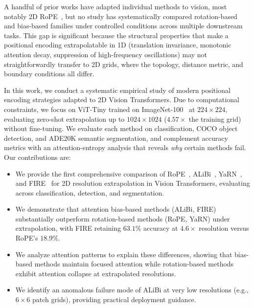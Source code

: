 A handful of prior works have adapted individual methods to vision, most notably 2D RoPE~\cite{heo2024rope}, but no study has systematically compared rotation-based and bias-based families under controlled conditions across multiple downstream tasks. This gap is significant because the structural properties that make a positional encoding extrapolatable in 1D (translation invariance, monotonic attention decay, suppression of high-frequency oscillations) may not straightforwardly transfer to 2D grids, where the topology, distance metric, and boundary conditions all differ.

In this work, we conduct a systematic empirical study of modern positional encoding strategies adapted to 2D Vision Transformers. Due to computational constraints, we focus on ViT-Tiny trained on ImageNet-100~\cite{deng2009imagenet} at $224 \times 224$, evaluating zero-shot extrapolation up to $1024 \times 1024$ ($4.57\times$ the training grid) without fine-tuning. We evaluate each method on classification, COCO object detection, and ADE20K semantic segmentation, and complement accuracy metrics with an attention-entropy analysis that reveals \emph{why} certain methods fail. Our contributions are:
\begin{itemize}
    \item We provide the first comprehensive comparison of RoPE~\cite{su2024roformer,heo2024rope}, ALiBi~\cite{press2022train}, YaRN~\cite{peng2024yarn}, and FIRE~\cite{li2024functional} for 2D resolution extrapolation in Vision Transformers, evaluating across classification, detection, and segmentation.
    \item We demonstrate that attention bias-based methods (ALiBi, FIRE) substantially outperform rotation-based methods (RoPE, YaRN) under extrapolation, with FIRE retaining $63.1\%$ accuracy at $4.6\times$ resolution versus RoPE's $18.9\%$.
    \item We analyze attention patterns to explain these differences, showing that bias-based methods maintain focused attention while rotation-based methods exhibit attention collapse at extrapolated resolutions.
    \item We identify an anomalous failure mode of ALiBi at very low resolutions (e.g., $6 \times 6$ patch grids), providing practical deployment guidance.
\end{itemize}
